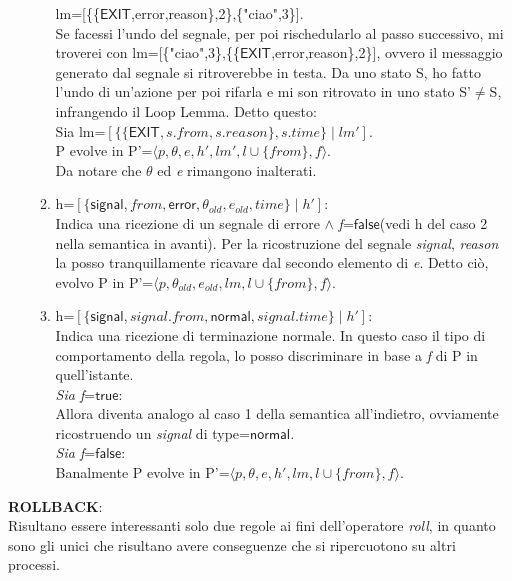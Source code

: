 \documentclass[Contributo.tex]{subfiles}
\begin{document}
\begin{itemize}
\begin{enumerate}
			  lm=[\{\{$\mathsf{EXIT}$,error,reason\},2\},\{"ciao",3\}].\\
			  Se facessi l'undo del segnale, per poi rischedularlo al passo successivo, mi troverei con lm=[\{"ciao",3\},\{\{$\mathsf{EXIT}$,error,reason\},2\}], ovvero il messaggio generato dal segnale si ritroverebbe in testa.
			  Da uno stato S, ho fatto l'undo di un'azione per poi rifarla e mi son ritrovato in uno stato S'$\neq$S, infrangendo il Loop Lemma.
			  Detto questo:\\
			  Sia lm=$\displaystyle [\{\{\mathsf{EXIT},s.from,s.reason\},s.time\} \mid lm']$.\\
			  P evolve in P'=$\displaystyle \langle p,\theta,e,h',lm',l \cup \{from\},f \rangle$.\\
			  Da notare che $\theta$ ed \textit{e} rimangono inalterati.
		\item h=$\displaystyle [\{\mathsf{signal},from,\mathsf{error},\theta_{old},e_{old},time\} \mid h']$:\\
			  Indica una ricezione di un segnale di errore $\wedge$ \textit{f}=$\mathsf{false}$(vedi h del caso 2 nella semantica in avanti).
			  Per la ricostruzione del segnale \textit{signal}, \textit{reason} la posso tranquillamente ricavare dal secondo elemento di \textit{e}.
			  Detto ciò, evolvo P in P'=$\displaystyle \langle p,\theta_{old},e_{old},lm,l \cup \{from\},f \rangle$.
		\item h=$\displaystyle [\{\mathsf{signal},signal.from,\mathsf{normal},signal.time\} \mid h']$:\\
			  Indica una ricezione di terminazione normale.
			  In questo caso il tipo di comportamento della regola, lo posso discriminare in base a \textit{f} di P in quell'istante.\\
			  \textit{Sia f}=$\mathsf{true}$:\\
			  Allora diventa analogo al caso 1 della semantica all'indietro, ovviamente ricostruendo un \textit{signal} di type=$\mathsf{normal}$.\\
			  \textit{Sia f}=$\mathsf{false}$:\\
			  Banalmente P evolve in P'=$\displaystyle \langle p,\theta,e,h',lm,l \cup \{from\},f \rangle$.
	\end{enumerate}
	\end{itemize}
\textbf{ROLLBACK}:\\
	Risultano essere interessanti solo due regole ai fini dell'operatore \textit{roll}, in quanto sono gli unici che risultano avere conseguenze che si ripercuotono su altri processi.
\end{document}

